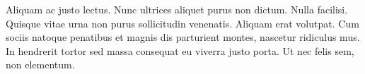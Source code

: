 \documentclass[a0paper,portrait]{baposter}
\begin{document}
\begin{poster}
{%

Aliquam ac justo lectus. Nunc ultrices aliquet purus non dictum. Nulla facilisi. Quisque vitae urna non purus sollicitudin venenatis. Aliquam erat volutpat. Cum sociis natoque penatibus et magnis dis parturient montes, nascetur ridiculus mus. In hendrerit tortor sed massa consequat eu viverra justo porta. Ut nec felis sem, non elementum.




}


\end{poster}
\end{document}
